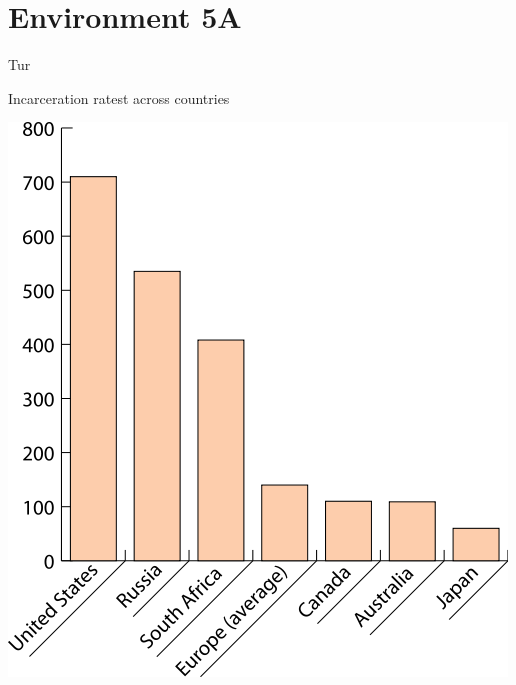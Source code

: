 
\section{Environment 5A}

\lipsum[1-2]

\begin{map}{T}{ur}
\caption{Incarceration ratest across countries}
\label{chart:incarceration}
\includegraphics[width=\chartwidth,height=\chartheight]{incarceration}  
\end{map}

